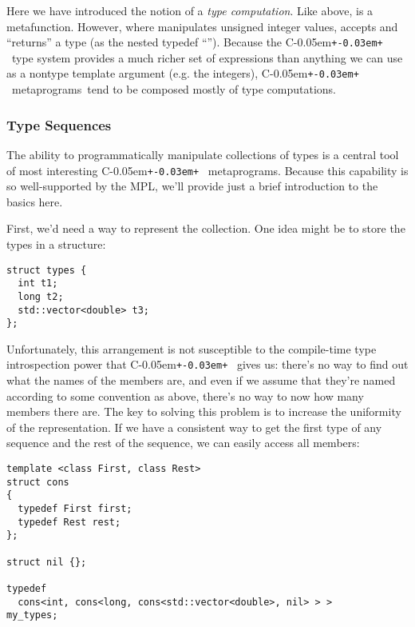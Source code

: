 \documentclass{kapproc}
\newcommand{\Cpp}{C\kern-0.05em\texttt{+\kern-0.03em+}%
}
\newcommand{\mpgms}{meta\-pro\-grams}
\newcommand{\mfn}{meta\-func\-tion}
\begin{document}
Here we have introduced the notion of a \emph{type computation}.  Like
 above,  is a
\mfn{}. However, where  manipulates unsigned integer
values,  accepts and ``returns'' a
type (as the nested typedef ``''). Because the \Cpp\ type
system provides a much richer set of expressions than anything we can
use as a nontype template argument (e.g. the integers), \Cpp\ \mpgms\
tend to be composed mostly of type computations.

\subsubsection{Type Sequences}

The ability to programmatically manipulate collections of types is a
central tool of most interesting \Cpp\ metaprograms. Because this
capability is so well-supported by the MPL, we'll provide just a brief
introduction to the basics here.

First, we'd need a way to represent the collection. One
idea might be to store the types in a structure:

{\small
\begin{codesamp}\begin{verbatim}
struct types {
  int t1;
  long t2;
  std::vector<double> t3;
};
\end{verbatim}
\end{codesamp}
}

Unfortunately, this arrangement is not susceptible to the compile-time
type introspection power that \Cpp\ gives us: there's no way to find
out what the names of the members are, and even if we assume that
they're named according to some convention as above, there's no way to
now how many members there are. The key to solving this problem is to
increase the uniformity of the representation. If we have a consistent
way to get the first type of any sequence and the rest of the
sequence, we can easily access all members:

{\small
\begin{codesamp}\begin{verbatim}
template <class First, class Rest>
struct cons
{
  typedef First first;
  typedef Rest rest;
};

struct nil {};

typedef
  cons<int, cons<long, cons<std::vector<double>, nil> > >
my_types;
\end{verbatim}
\end{codesamp}
}
\end{document}
